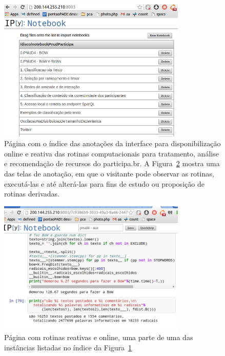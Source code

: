 \documentclass[12pt]{article}
\begin{document}
\begin{figure}[h!]
  \centering
      \includegraphics[width=0.8\textwidth]{screenshots/inb1}
  \caption{Página com o índice das anotações da interface para disponibilização online e reativa das rotinas computacionais para tratamento, análise e recomendação de recursos do participa.br. A Figura~\ref{fig:inb2} mostra uma das telas de anotação, em que o visitante pode observar as rotinas, executá-las e até alterá-las para fins de estudo ou proposição de rotinas derivadas.}\label{fig:inb1}
\end{figure}


\begin{figure}[h!]
  \centering
      \includegraphics[width=0.8\textwidth]{screenshots/inb2}
  \caption{Página com rotinas reativas e online, uma parte de uma das instâncias listadas no índice da Figura~\ref{fig:inb1}}\label{fig:inb2}
\end{figure}
\end{document}
